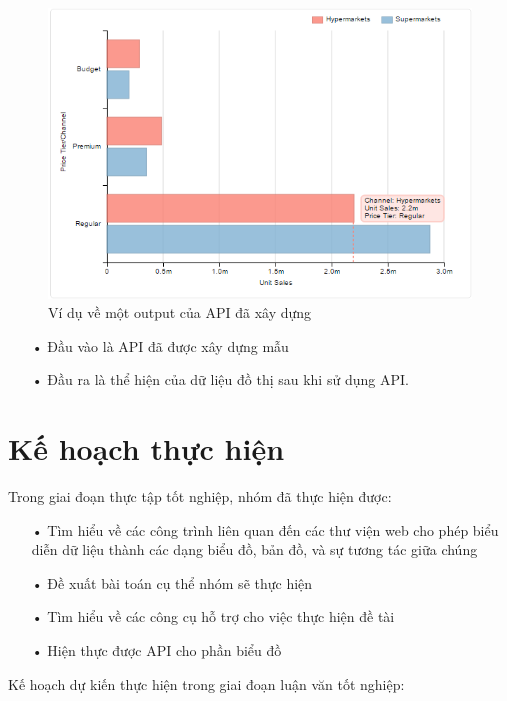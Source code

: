 \documentclass[12pt,a4paper,oneside]{article}
\begin{document}
\begin{figure}[htp]
	\begin{center}
    \includegraphics[scale=.8]{image/api_sample}
    \caption{Ví dụ về một output của API đã xây dựng}
    \label{refhinh21}
    \end{center}
\end{figure}

\begin{itemize}
\item[•] Đầu vào là API đã được xây dựng mẫu
\item[•] Đầu ra là thể hiện của dữ liệu đồ thị sau khi sử dụng API.
\end{itemize}

\section{Kế hoạch thực hiện}
Trong giai đoạn thực tập tốt nghiệp, nhóm đã thực hiện được:

\begin{itemize}
\item[•]Tìm hiểu về các công trình liên quan đến các thư viện web cho phép biểu diễn dữ liệu thành các dạng biểu đồ, bản đồ, và sự tương tác giữa chúng

\item[•]Đề xuất bài toán cụ thể nhóm sẽ thực hiện

\item[•]Tìm hiểu về các công cụ hỗ trợ cho việc thực hiện đề tài

\item[•]Hiện thực được API cho phần biểu đồ

\end{itemize}
Kế hoạch dự kiến thực hiện trong giai đoạn luận văn tốt nghiệp:
\end{document}
